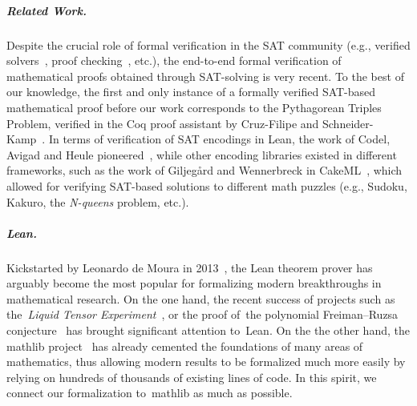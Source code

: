 \subparagraph*{Related Work.} Despite the crucial role of formal verification in the SAT community (e.g., verified solvers~\cite{oeVersatVerifiedModern2012,skotam_creusat_2022}, proof checking~\cite{lammichEfficientVerifiedSAT2020,tanVerifiedPropagationRedundancy2023}, etc.), the end-to-end formal verification of mathematical proofs obtained through SAT-solving is very recent. To the best of our knowledge, the first and only instance of a formally verified SAT-based mathematical proof before our work corresponds to the Pythagorean Triples Problem, verified in the \textsf{Coq} proof assistant by Cruz-Filipe and Schneider-Kamp~\cite{formalPythagoreanTriples,LPAR-21:Formally_Proving_Boolean_Pythagorean}. In terms of verification of SAT encodings in Lean, the work of Codel, Avigad and Heule pioneered~\cite{Cayden}, while other encoding libraries existed in different frameworks, such as the work of Giljeg\r{a}rd and Wennerbreck in \textsf{CakeML}~\cite{GilAndWennerbeck}, which allowed for verifying SAT-based solutions to different math puzzles (e.g., Sudoku, Kakuro, the \emph{N-queens} problem, etc.).


\subparagraph*{Lean.} Kickstarted by Leonardo de Moura in 2013~\cite{demouraLeanTheoremProver2015}, the Lean theorem prover has arguably become the most popular for formalizing modern breakthroughs in mathematical research. 
On the one hand, the recent success of projects such as the~\emph{Liquid Tensor Experiment}~\cite{Castelvecchi2021}, or the proof of~the polynomial Freiman–Ruzsa conjecture~\cite{gowers2023conjecture, slomanATeamMathProves2023} has brought significant attention to~Lean. %
On the the other hand, the \textsf{mathlib} project~\cite{The_mathlib_Community_2020} has already cemented the foundations of many areas of mathematics, thus allowing modern results to be formalized much more easily by relying on hundreds of thousands of existing lines of code. In this spirit, we connect our formalization to~\textsf{mathlib} as much as possible.

